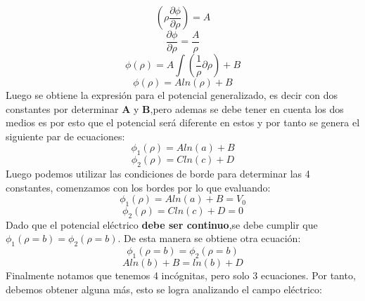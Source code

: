 \documentclass[
  11pt,
  letterpaper,
   addpoints,
  ]{exam}
\begin{document}
\begin{questions}
\begin{solution}
\begin{enumerate}
            \begin{equation}
                 \left(\rho \frac{\partial \phi}{\partial \rho}\right) = A
            \end{equation}
            \begin{equation}
                 \frac{\partial \phi}{\partial \rho} = \frac{A}{\rho}
            \end{equation}
            \begin{equation}
                 \phi(\rho) = A\int\left(\frac{1}{\rho}\partial\rho\right) + B
            \end{equation}
            \begin{equation}
                  \phi(\rho) = Aln(\rho) + B
            \end{equation}
            Luego se obtiene la expresión para el potencial generalizado, es decir con dos constantes por determinar \textbf{A} y \textbf{B},pero ademas se debe tener en cuenta los dos medios es por esto que el potencial será diferente en estos y por tanto se genera el siguiente par de ecuaciones:
            \begin{equation}
                \phi_{1}(\rho) = Aln(a) + B 
            \end{equation}
            \begin{equation}
                \phi_{2}(\rho) = Cln(c) + D 
            \end{equation}
            Luego podemos utilizar las condiciones de borde para determinar las 4 constantes, comenzamos con los bordes por lo que evaluando:
            \begin{equation}
                \phi_{1}(\rho) = Aln(a) + B = V_{0}
            \end{equation}
            \begin{equation}
                \phi_{2}(\rho) = Cln(c) + D = 0
            \end{equation}
            Dado que el potencial eléctrico \textbf{debe ser continuo},se debe cumplir que $\phi_{1}(\rho=b) =\phi_{2}(\rho=b) $. De esta manera se obtiene otra ecuación:
            \begin{equation}
                \phi_{1}(\rho=b) = \phi_{2}(\rho=b)
            \end{equation}
            \begin{equation}
                Aln(b) + B = ln(b) + D 
            \end{equation}
            Finalmente notamos que tenemos 4 incógnitas, pero solo 3 ecuaciones. Por tanto, debemos obtener alguna más, esto se logra analizando el campo eléctrico:

\end{enumerate}
\end{solution}
\end{questions}
\end{document}
